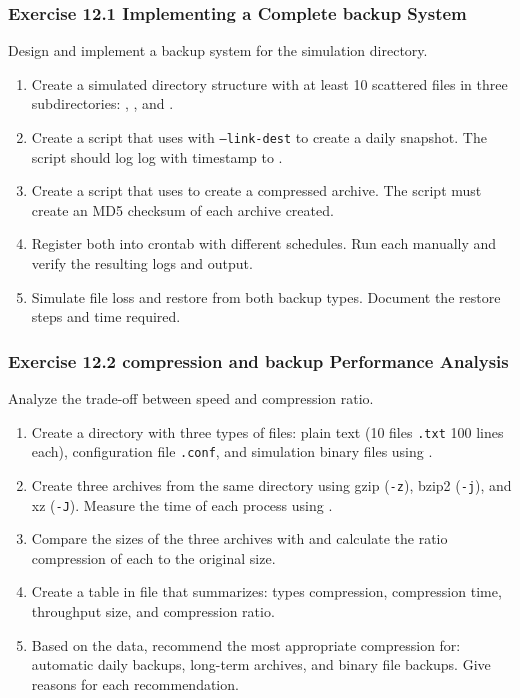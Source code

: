 \subsubsection*{Exercise 12.1 Implementing a Complete backup System}
Design and implement a backup system for the simulation directory.
\begin{enumerate}
\item Create a simulated directory structure with at least 10 scattered files
in three subdirectories: , , and .
\item Create a script  that uses  with
\texttt{--link-dest} to create a daily snapshot. The script should log
log with timestamp to .
\item Create a script  that uses 
to create a compressed archive. The script must create an MD5 checksum of each archive created.
\item Register both into crontab with different schedules. Run
each manually and verify the resulting logs and output.
\item Simulate file loss and restore from both backup types.
Document the restore steps and time required.
\end{enumerate}

\subsubsection*{Exercise 12.2 compression and backup Performance Analysis}
Analyze the trade-off between speed and compression ratio.
\begin{enumerate}
\item Create a directory with three types of files: plain text (10 files \texttt{.txt}
100 lines each), configuration file \texttt{.conf}, and simulation binary files using .
\item Create three archives from the same directory using gzip (\texttt{-z}),
bzip2 (\texttt{-j}), and xz (\texttt{-J}). Measure the time of each process using .
\item Compare the sizes of the three archives with  and calculate the ratio
compression of each to the original size.
\item Create a table in file  that summarizes: types
compression, compression time, throughput size, and compression ratio.
\item Based on the data, recommend the most appropriate compression
for: automatic daily backups, long-term archives, and binary file backups. Give reasons for each recommendation.
\end{enumerate}

